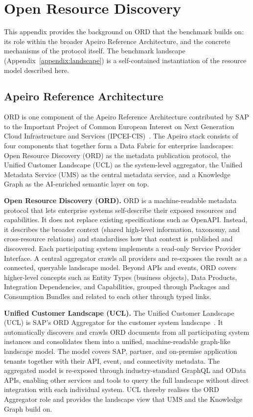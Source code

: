 \section{Open Resource Discovery}
\label{appendix:ord}

This appendix provides the background on ORD that the benchmark builds on: its role within the broader Apeiro Reference Architecture, and the concrete mechanisms of the protocol itself. The benchmark landscape (Appendix~\ref{appendix:landscape}) is a self-contained instantiation of the resource model described here.

\subsection{Apeiro Reference Architecture}
\label{appendix:ord-apeiro}

ORD is one component of the Apeiro Reference Architecture contributed by SAP to the Important Project of Common European Interest on Next Generation Cloud Infrastructure and Services (IPCEI-CIS)~\cite{sap_se_apeiro_2026}. The Apeiro stack consists of four components that together form a Data Fabric for enterprise landscapes: Open Resource Discovery (ORD) as the metadata publication protocol, the Unified Customer Landscape (UCL) as the system-level aggregator, the Unified Metadata Service (UMS) as the central metadata service, and a Knowledge Graph as the AI-enriched semantic layer on top.

\textbf{Open Resource Discovery (ORD).} ORD is a machine-readable metadata protocol that lets enterprise systems self-describe their exposed resources and capabilities. It does not replace existing specifications such as OpenAPI. Instead, it describes the broader context (shared high-level information, taxonomy, and cross-resource relations) and standardises how that context is published and discovered. Each participating system implements a read-only Service Provider Interface. A central aggregator crawls all providers and re-exposes the result as a connected, queryable landscape model. Beyond APIs and events, ORD covers higher-level concepts such as Entity Types (business objects), Data Products, Integration Dependencies, and Capabilities, grouped through Packages and Consumption Bundles and related to each other through typed links.

\textbf{Unified Customer Landscape (UCL).} The Unified Customer Landscape (UCL) is SAP's ORD Aggregator for the customer system landscape~\cite{sap_se_apeiro_2026,linux_foundation_europe_open_nodate}. It automatically discovers and crawls ORD documents from all participating system instances and consolidates them into a unified, machine-readable graph-like landscape model. The model covers SAP, partner, and on-premise application tenants together with their API, event, and connectivity metadata. The aggregated model is re-exposed through industry-standard GraphQL and OData APIs, enabling other services and tools to query the full landscape without direct integration with each individual system. UCL thereby realises the ORD Aggregator role and provides the landscape view that UMS and the Knowledge Graph build on.

